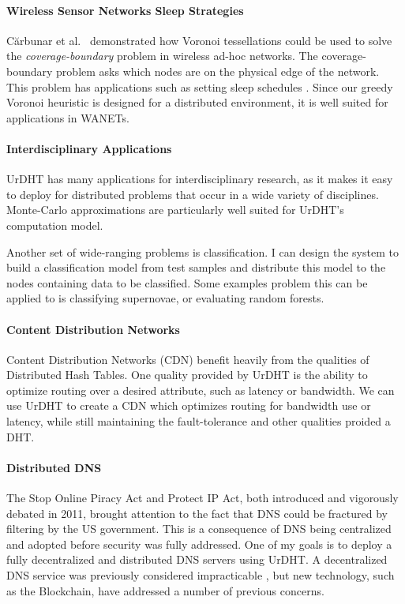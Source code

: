\documentclass[letterpaper]{article}
\begin{document}
\paragraph*{Wireless Sensor Networks Sleep Strategies} C\u{a}rbunar et al.\ \cite{carbunar2004distributed} demonstrated how Voronoi tessellations could be used to solve the \textit{coverage-boundary} problem in wireless ad-hoc networks.
The coverage-boundary problem asks which nodes are on the physical edge of the network.
This problem  has applications such as setting sleep schedules \cite{chen2008voronoi}.
Since our greedy Voronoi heuristic is designed for a distributed environment, it is well suited for applications in WANETs. 


\paragraph*{Interdisciplinary Applications}
UrDHT has many applications for interdisciplinary research, as it makes it easy to deploy for distributed problems that occur in a wide variety of disciplines.
Monte-Carlo approximations are particularly well suited for UrDHT's computation model.

Another set of wide-ranging problems is classification.  
I can design the system to build a classification model from test samples and distribute this model to the nodes containing data to be classified.
Some examples problem this can be applied to is classifying supernovae, or evaluating random forests.


\paragraph*{Content Distribution Networks}
Content Distribution Networks (CDN) benefit heavily from the qualities of Distributed Hash Tables.
One quality provided by UrDHT is the ability to optimize routing over a desired attribute, such as latency or bandwidth.
We can use UrDHT to create a CDN which optimizes routing for bandwidth use or latency, while still maintaining the fault-tolerance and other qualities proided a DHT.


\paragraph*{Distributed DNS}
The Stop Online Piracy Act and Protect IP Act, both introduced and vigorously debated in 2011, brought attention to the fact that DNS could be fractured by filtering by the US government.
This is a consequence of DNS being centralized  and adopted before security was fully addressed.
One of my goals is to deploy a fully decentralized and distributed DNS servers using UrDHT.
A decentralized DNS service was previously considered impracticable \cite{cox2002serving}, but new technology, such as the Blockchain, have addressed a number of previous concerns.
\end{document}
